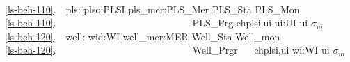 \mnewfoil
\pos{}{\vspace*{-10mm}}
\bp
{}\\
\ref{ls-beh-110}.\ \ pls: plso:PLSI {\RIGHTARROW} pls\_mer:PLS\_Mer {\RIGHTARROW} PLS\_Sta {\RIGHTARROW} PLS\_Mon {\RIGHTARROW}\\
\ref{ls-beh-110}.\ \ \ \ \ \ \ \ \ \ \ \ \ \ \ \ \ \ \ \ \ \ \ \ \ \ \ \ PLS\_Prg {\RIGHTARROW} {\LBRACE} ch{\LBRACKET}{\LBRACE}plsi,ui{\RBRACE}{\RBRACKET} {\BAR} ui:UI {\RDOT} ui {\ISIN} $\sigma$$_{ui}$ {\RBRACE} \ \ \ \\
\ref{ls-beh-120}.\ \ well: wid:WI {\RIGHTARROW} well\_mer:MER {\RIGHTARROW} Well\_Sta {\RIGHTARROW} Well\_mon {\RIGHTARROW}\ \ \\
\ref{ls-beh-120}.\ \ \ \ \ \ \ \ \ \ \ \ \ \ \ \ \ \ \ \ \ \ \ \ \ \ \ \ Well\_Prgr {\RIGHTARROW}\ \ {\LBRACE} ch{\LBRACKET}{\LBRACE}plsi,ui{\RBRACE}{\RBRACKET} {\BAR} wi:WI {\RDOT} ui {\ISIN} $\sigma$$_{ui}$ {\RBRACE}  \\
